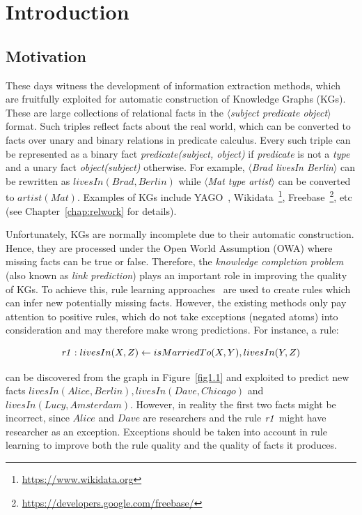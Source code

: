 \chapter{Introduction}
\label{chap:intro}

\section{Motivation}
\label{chap:motivation}

These days witness the development of information extraction methods, which are fruitfully exploited for automatic construction of Knowledge Graphs (KGs). These are large collections of relational facts in the \textit{$\langle$subject predicate object$\rangle$} format. Such triples reflect facts about the real world, which can be converted to facts over unary and binary relations in predicate calculus. Every such triple can be represented as a binary fact \textit{predicate(subject, object)} if \textit{predicate} is not a \textit{type} and a unary fact \textit{object(subject)} otherwise. For example, \textit{$\langle$Brad livesIn Berlin$\rangle$} can be rewritten as $livesIn(Brad, Berlin)$ while \textit{$\langle$Mat type artist$\rangle$} can be converted to $artist(Mat)$. Examples of KGs include YAGO~\cite{ref28}, Wikidata~\footnote{\url{https://www.wikidata.org}}, Freebase~\footnote{\url{https://developers.google.com/freebase/}}, etc (see Chapter~\ref{chap:relwork} for details).

Unfortunately, KGs are normally incomplete due to their automatic construction. Hence, they are processed under the Open World Assumption (OWA) where missing facts can be true or false. Therefore, the \textit{knowledge completion problem} (also known as \textit{link prediction}) plays an important role in improving the quality of KGs. To achieve this, rule learning approaches~\cite{ref39, ref10} are used to create rules which can infer new potentially missing facts. However, the existing methods only pay attention to positive rules, which do not take exceptions (negated atoms) into consideration and may therefore make wrong predictions. For instance, a rule:

\begin{equation}
\mathit{r1}: livesIn(X,Z) \leftarrow isMarriedTo(X,Y), livesIn(Y,Z)
\end{equation}
\label{rule1}

\noindent can be discovered from the graph in Figure~\ref{fig1.1} and exploited to predict new facts $livesIn(Alice, Berlin), livesIn(Dave, Chicago)$ and $livesIn(Lucy, Amsterdam)$. However, in reality the first two facts might be incorrect, since $Alice$ and $Dave$ are researchers and the rule $\mathit{r1}$ might have researcher as an exception. Exceptions should be taken into account in rule learning to improve both the rule quality and the quality of facts it produces.

